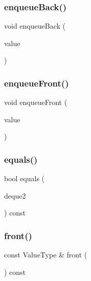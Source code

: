 \mbox{\label{classDeque_a2fdd7308cc72a3bd03dd6345ef778a65}} 
\subsubsection{\texorpdfstring{enqueue\+Back()}{enqueueBack()}}
{\footnotesize\ttfamily void enqueue\+Back (\begin{DoxyParamCaption}\item[{const Value\+Type \&}]{value }\end{DoxyParamCaption})}

\mbox{\label{classDeque_a12586c9fec2e0dd724cf6ccb4d52c6e8}} 
\subsubsection{\texorpdfstring{enqueue\+Front()}{enqueueFront()}}
{\footnotesize\ttfamily void enqueue\+Front (\begin{DoxyParamCaption}\item[{const Value\+Type \&}]{value }\end{DoxyParamCaption})}

\mbox{\label{classDeque_a2468abeaef57d95b43a90b7462ff88ab}} 
\subsubsection{\texorpdfstring{equals()}{equals()}}
{\footnotesize\ttfamily bool equals (\begin{DoxyParamCaption}\item[{const \mbox{\hyperlink{classDeque}{Deque}}$<$ Value\+Type $>$ \&}]{deque2 }\end{DoxyParamCaption}) const}

\mbox{\label{classDeque_a02aaa52ad7a120201f6dd3e90eff737f}} 
\subsubsection{\texorpdfstring{front()}{front()}}
{\footnotesize\ttfamily const Value\+Type \& front (\begin{DoxyParamCaption}{ }\end{DoxyParamCaption}) const}

